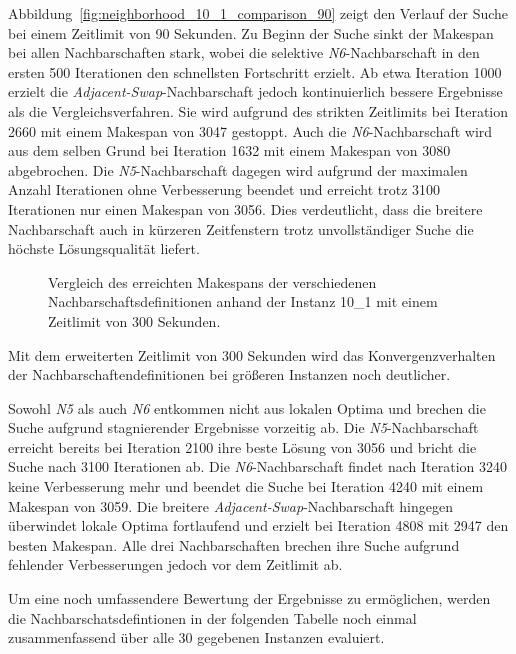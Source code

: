 Abbildung~\ref{fig:neighborhood_10_1_comparison_90} zeigt den Verlauf der Suche bei einem Zeitlimit von 90 Sekunden.
Zu Beginn der Suche sinkt der Makespan bei allen Nachbarschaften stark, wobei die selektive \emph{N6}-Nachbarschaft in den ersten 500 Iterationen den schnellsten Fortschritt erzielt.
Ab etwa Iteration 1000 erzielt die \emph{Adjacent-Swap}-Nachbarschaft jedoch kontinuierlich bessere Ergebnisse als die Vergleichsverfahren.
Sie wird aufgrund des strikten Zeitlimits bei Iteration 2660 mit einem Makespan von 3047 gestoppt.
Auch die \emph{N6}-Nachbarschaft wird aus dem selben Grund bei Iteration 1632 mit einem Makespan von 3080 abgebrochen.
Die \emph{N5}-Nachbarschaft dagegen wird aufgrund der maximalen Anzahl Iterationen ohne Verbesserung beendet und erreicht trotz 3100 Iterationen nur einen Makespan von 3056.
Dies verdeutlicht, dass die breitere Nachbarschaft auch in kürzeren Zeitfenstern trotz unvollständiger Suche die höchste Lösungsqualität liefert.

\begin{figure}[H]
    \centering
    
    \caption{Vergleich des erreichten Makespans der verschiedenen Nachbarschaftsdefinitionen anhand der Instanz 10\_1 mit einem Zeitlimit von 300 Sekunden.}
    \label{fig:neighborhood_10_1_comparison_300}
\end{figure}

Mit dem erweiterten Zeitlimit von 300 Sekunden wird das Konvergenzverhalten der Nachbarschaftendefinitionen bei größeren Instanzen noch deutlicher.

Sowohl \emph{N5} als auch \emph{N6} entkommen nicht aus lokalen Optima und brechen die Suche aufgrund stagnierender Ergebnisse vorzeitig ab.
Die \emph{N5}-Nachbarschaft erreicht bereits bei Iteration 2100 ihre beste Lösung von 3056 und bricht die Suche nach 3100 Iterationen ab.
Die \emph{N6}-Nachbarschaft findet nach Iteration 3240 keine Verbesserung mehr und beendet die Suche bei Iteration 4240 mit einem Makespan von 3059.
Die breitere \emph{Adjacent-Swap}-Nachbarschaft hingegen überwindet lokale Optima fortlaufend und erzielt bei Iteration 4808 mit 2947 den besten Makespan.
Alle drei Nachbarschaften brechen ihre Suche aufgrund fehlender Verbesserungen jedoch vor dem Zeitlimit ab.

Um eine noch umfassendere Bewertung der Ergebnisse zu ermöglichen, werden die Nachbarschatsdefintionen in der folgenden Tabelle noch einmal zusammenfassend über alle 30 gegebenen Instanzen evaluiert.

